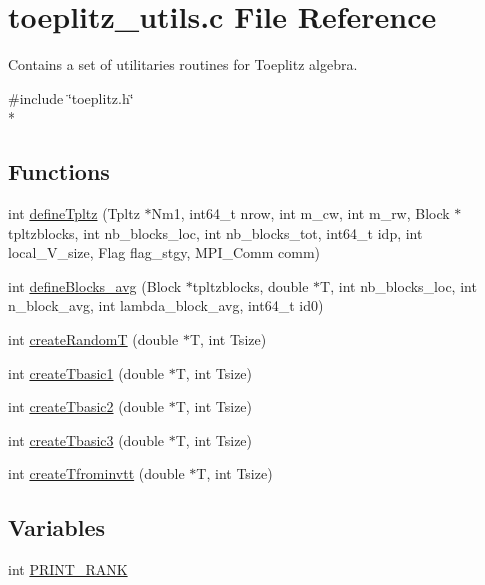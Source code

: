 \section{toeplitz\-\_\-utils.\-c File Reference}
\label{toeplitz__utils_8c}


Contains a set of utilitaries routines for Toeplitz algebra.  


{\ttfamily \#include \char`\"{}toeplitz.\-h\char`\"{}}\\*
\subsection*{Functions}
\begin{DoxyCompactItemize}
\item 
int \hyperlink{toeplitz__utils_8c_a080c7fa4d4c35aef9389d777fe2625be}{define\-Tpltz} (Tpltz $\ast$Nm1, int64\-\_\-t nrow, int m\-\_\-cw, int m\-\_\-rw, Block $\ast$tpltzblocks, int nb\-\_\-blocks\-\_\-loc, int nb\-\_\-blocks\-\_\-tot, int64\-\_\-t idp, int local\-\_\-\-V\-\_\-size, Flag flag\-\_\-stgy, M\-P\-I\-\_\-\-Comm comm)
\item 
int \hyperlink{toeplitz__utils_8c_ae35e762f7f467f3c2e5ae4a10eee1569}{define\-Blocks\-\_\-avg} (Block $\ast$tpltzblocks, double $\ast$T, int nb\-\_\-blocks\-\_\-loc, int n\-\_\-block\-\_\-avg, int lambda\-\_\-block\-\_\-avg, int64\-\_\-t id0)
\item 
int \hyperlink{toeplitz__utils_8c_afd66a4b165e762bcdd42fab1c1b9a305}{create\-Random\-T} (double $\ast$T, int Tsize)
\item 
int \hyperlink{toeplitz__utils_8c_adb3085be919676c8abdbe1ba1dc1d53a}{create\-Tbasic1} (double $\ast$T, int Tsize)
\item 
int \hyperlink{toeplitz__utils_8c_a5fc110e6ebd713ac93ed3e3b115f3c54}{create\-Tbasic2} (double $\ast$T, int Tsize)
\item 
int \hyperlink{toeplitz__utils_8c_adb00a5dd5479deac50815f8d4d67ad46}{create\-Tbasic3} (double $\ast$T, int Tsize)
\item 
int \hyperlink{toeplitz__utils_8c_a795d607f44bc2ad76baddb3f600acb46}{create\-Tfrominvtt} (double $\ast$T, int Tsize)
\end{DoxyCompactItemize}
\subsection*{Variables}
\begin{DoxyCompactItemize}
\item 
int \hyperlink{toeplitz__utils_8c_a300d52d9923297872ffb24962a0f0ce6}{P\-R\-I\-N\-T\-\_\-\-R\-A\-N\-K}
\end{DoxyCompactItemize}


